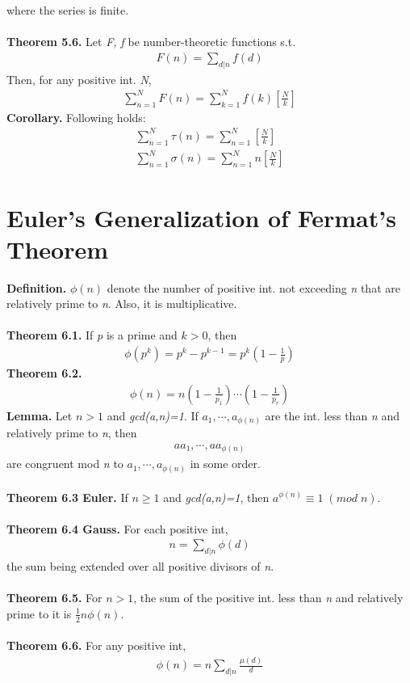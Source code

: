 \documentclass[a4paper,10pt]{article}
\begin{document}
where the series is finite. \\ \\
\textbf{Theorem 5.6.} Let \textit{F, f} be number-theoretic functions s.t.
\begin{align}
F(n)=\sum_{d|n}{f(d)}
\end{align}
Then, for any positive int. \textit{N},
\begin{align}
\sum_{n=1}^{N}{F(n)}=\sum_{k=1}^{N}{f(k)[\frac{N}{k}]}
\end{align}
\textbf{Corollary.} Following holds:
\begin{align}
\sum_{n=1}^{N}{\tau(n)}=\sum_{n=1}^{N}{[\frac{N}{k}]} \\
\sum_{n=1}^{N}{\sigma(n)}=\sum_{n=1}^{N}{n[\frac{N}{k}]}
\end{align}


\section{Euler's Generalization of Fermat's Theorem}
\textbf{Definition.} \textit{$\phi(n)$} denote the number of positive int. not exceeding \textit{n} that are relatively prime to \textit{n}. Also, it is multiplicative. \\ \\
\textbf{Theorem 6.1.} If \textit{p} is a prime and \textit{$k>0$}, then
\begin{align}
\phi(p^{k})=p^{k}-p^{k-1}=p^{k}(1-\frac{1}{p})
\end{align}
\textbf{Theorem 6.2.}
\begin{align}
\phi(n)=n(1-\frac{1}{p_{1}})\cdots (1-\frac{1}{p_{r}})
\end{align}
\textbf{Lemma.} Let \textit{$n>1$} and \textit{gcd(a,n)=1}. If \textit{$a_{1}, \cdots, a_{\phi(n)}$} are the int. less than \textit{n} and relatively prime to \textit{n}, then
\begin{align}
aa_{1}, \cdots, aa_{\phi(n)}
\end{align}
are congruent mod \textit{n} to \textit{$a_{1}, \cdots, a_{\phi(n)}$} in some order. \\ \\
\textbf{Theorem 6.3 Euler.} If \textit{$n\geq1$} and \textit{gcd(a,n)=1}, then \textit{$a^{\phi(n)}\equiv1 \; (mod \; n)$}. \\ \\
\textbf{Theorem 6.4 Gauss.} For each positive int,
\begin{align}
n=\sum_{d|n}{\phi(d)}
\end{align}
the sum being extended over all positive divisors of \textit{n}. \\ \\
\textbf{Theorem 6.5.} For \textit{$n>1$}, the sum of the positive int. less than \textit{n} and relatively prime to it is \textit{$\frac{1}{2}n\phi(n)$}. \\ \\
\textbf{Theorem 6.6.} For any positive int,
\begin{align}
\phi(n)=n\sum_{d|n}{\frac{\mu(d)}{d}}
\end{align}
\end{document}
